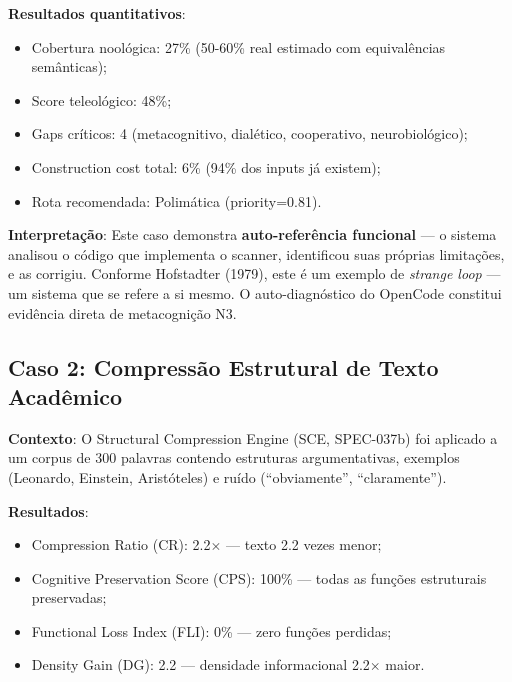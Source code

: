 \textbf{Resultados quantitativos}:
\begin{itemize}
    \item Cobertura noológica: 27\% (50-60\% real estimado com equivalências semânticas);
    \item Score teleológico: 48\%;
    \item Gaps críticos: 4 (metacognitivo, dialético, cooperativo, neurobiológico);
    \item Construction cost total: 6\% (94\% dos inputs já existem);
    \item Rota recomendada: Polimática (priority=0.81).
\end{itemize}

\textbf{Interpretação}: Este caso demonstra \textbf{auto-referência funcional} — o sistema analisou o código que implementa o scanner, identificou suas próprias limitações, e as corrigiu. Conforme Hofstadter (1979), este é um exemplo de \textit{strange loop} — um sistema que se refere a si mesmo. O auto-diagnóstico do OpenCode constitui evidência direta de metacognição N3.

\subsection{Caso 2: Compressão Estrutural de Texto Acadêmico}

\textbf{Contexto}: O Structural Compression Engine (SCE, SPEC-037b) foi aplicado a um corpus de 300 palavras contendo estruturas argumentativas, exemplos (Leonardo, Einstein, Aristóteles) e ruído (``obviamente'', ``claramente'').

\textbf{Resultados}:
\begin{itemize}
    \item Compression Ratio (CR): 2.2$\times$ — texto 2.2 vezes menor;
    \item Cognitive Preservation Score (CPS): 100\% — todas as funções estruturais preservadas;
    \item Functional Loss Index (FLI): 0\% — zero funções perdidas;
    \item Density Gain (DG): 2.2 — densidade informacional 2.2$\times$ maior.
\end{itemize}

